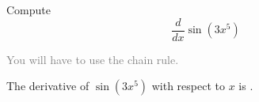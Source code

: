 \documentclass{article}
\begin{document}
\begin{preview}
\huge
  Compute
  \[
  \frac{d}{dx} \sin(3x^5)
  \]

  \vspace{2ex}
  \textcolor{gray}{You will have to use the chain rule.}

  \vspace{2ex}
  The derivative of $\sin(3x^5)$ with respect to $x$ is
  \framebox{\raisebox{2ex}{\vspace{5ex}}\hspace{4em}}.
\end{preview}
\end{document}
